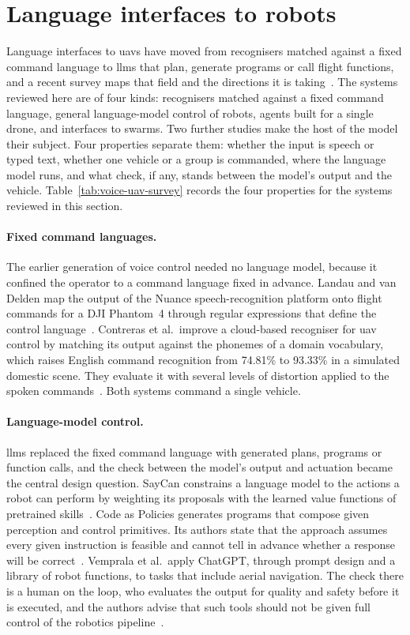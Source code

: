 \section{Language interfaces to robots}
\label{sec:voice-uav}
Language interfaces to \glspl{uav} have moved from recognisers matched against a fixed command
language to \glspl{llm} that plan, generate programs or call flight functions, and a recent survey
maps that field and the directions it is taking~\cite{javaid2024}. The systems reviewed here are of
four kinds: recognisers matched against a fixed command language, general language-model control
of robots, agents built for a single drone, and interfaces to swarms. Two further studies make the
host of the model their subject. Four properties separate them:
whether the input is speech or typed text, whether one vehicle or a group is commanded, where the
language model runs, and what check, if any, stands between the model's output and the vehicle.
Table~\ref{tab:voice-uav-survey} records the four properties for the systems reviewed in this
section.

\paragraph{Fixed command languages.} The earlier generation of voice control needed no language
model, because it confined the operator to a command language fixed in advance. Landau and van
Delden map the output of the Nuance speech-recognition platform onto flight commands for a DJI
Phantom~4 through regular expressions that define the control language~\cite{landau2017}.
Contreras et al.\ improve a cloud-based recogniser for \gls{uav} control by matching its output
against the phonemes of a domain vocabulary, which raises English command recognition from 74.81\%
to 93.33\% in a simulated domestic scene. They evaluate it with several levels of distortion applied
to the spoken commands~\cite{contreras2020}. Both systems command a single vehicle.

\paragraph{Language-model control.} \Glspl{llm} replaced the fixed command language with generated
plans, programs or function calls, and the check between the model's output and actuation became
the central design question. SayCan constrains a language model to the actions a robot can perform
by weighting its proposals with the learned value functions of pretrained skills~\cite{saycan2022}.
Code as Policies generates programs that compose given perception and control primitives. Its
authors state that the approach assumes every given instruction is feasible and cannot tell in
advance whether a response will be correct~\cite{codeaspolicies2023}. Vemprala et al.\ apply
ChatGPT, through prompt design and a library of robot functions, to tasks that include aerial
navigation. The check there is a human on the loop, who evaluates the output for quality and safety
before it is executed, and the authors advise that such tools should not be given full control of
the robotics pipeline~\cite{chatgptrobotics2024}.

